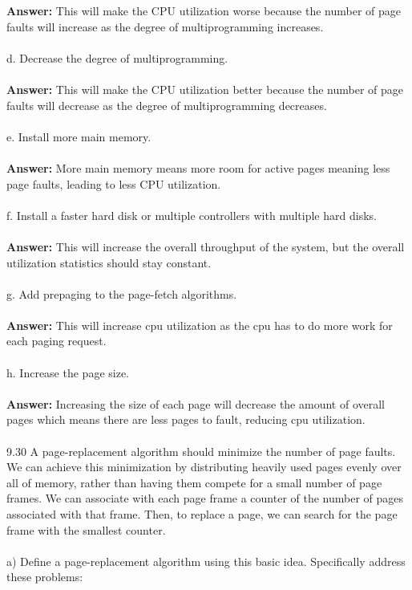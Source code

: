\documentclass[12pt]{article}
\begin{document}
\textbf{Answer: } This will make the CPU utilization worse because the number of 
page faults will increase as the degree of multiprogramming increases.
\\\\
d. Decrease the degree of multiprogramming.\\\\
\textbf{Answer: }This will make the CPU utilization better because the number of 
page faults will decrease as the degree of multiprogramming decreases.
\\\\
e. Install more main memory.\\\\
\textbf{Answer: } More main memory means more room for active pages meaning less 
page faults, leading to less CPU utilization.
\\\\
f. Install a faster hard disk or multiple controllers with multiple hard
disks.\\\\
\textbf{Answer: } This will increase the overall throughput of the system, but 
the overall utilization statistics should stay constant.
\\\\
g. Add prepaging to the page-fetch algorithms.\\\\
\textbf{Answer: } This will increase cpu utilization as the cpu has to do more 
work for each paging request.
\\\\
h. Increase the page size.\\\\
\textbf{Answer: } Increasing the size of each page will decrease the amount of overall 
pages which means there are less pages to fault, reducing cpu utilization.
\\\\
9.30 A page-replacement algorithm should minimize the number of page
faults. We can achieve this minimization by distributing heavily used
pages evenly over all of memory, rather than having them compete for
a small number of page frames. We can associate with each page frame
a counter of the number of pages associated with that frame. Then,
to replace a page, we can search for the page frame with the smallest
counter.\\\\
a) Define a page-replacement algorithm using this basic idea. Specifically
address these problems:\\
\end{document}
